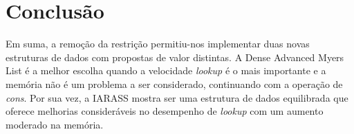 \section{Conclusão}

Em suma, a remoção da restrição permitiu-nos implementar duas novas estruturas de dados com propostas de valor distintas.
A Dense Advanced Myers List é a melhor escolha quando a velocidade \textit{lookup} é o mais importante e a memória não é um problema a ser considerado, 
continuando com a operação de \textit{cons}. Por sua vez, a IARASS mostra ser uma estrutura de dados equilibrada que oferece melhorias consideráveis no 
desempenho de \textit{lookup} com um aumento moderado na memória.
